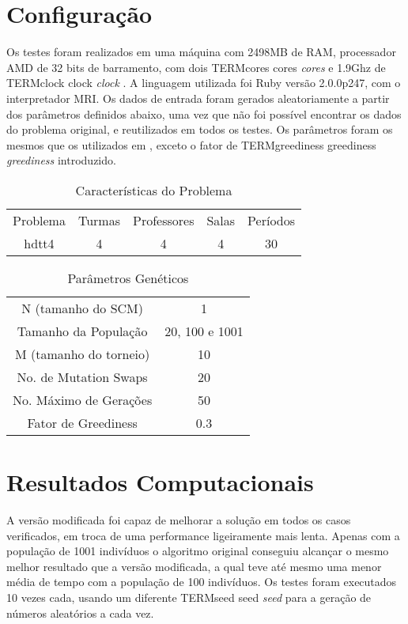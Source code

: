\documentclass[12pt,a4paper]{article}
\def\foreign#1{%
  \ifcsname TERM#1\endcsname%
  #1%
  \else%
  \emph{#1}%
  \expandafter\gdef\csname TERM#1\endcsname{}%
\fi}
\begin{document}
\section{Configuração}
Os testes foram realizados em uma máquina com 2498MB de RAM, processador AMD de
32 bits de barramento, com dois \foreign{cores} e 1.9Ghz de \foreign{clock}. A
linguagem utilizada foi Ruby versão 2.0.0p247, com o interpretador MRI. Os dados
de entrada foram gerados aleatoriamente a partir dos parâmetros definidos
abaixo, uma vez que não foi possível encontrar os dados do problema original, e
reutilizados em todos os testes. Os parâmetros foram os mesmos que os utilizados
em \cite{Raghavjee:2008:GASTP}, exceto o fator de \foreign{greediness}
introduzido.

\begin{table}
  \caption{Características do Problema}
  \centering
  \begin{tabular}{ c c c c c }
    Problema & Turmas & Professores & Salas & Períodos \\
       hdtt4 & 4 & 4 & 4 & 30 \\
  \end{tabular}
\end{table}

\begin{table}
  \caption{Parâmetros Genéticos}
  \centering
  \begin{tabular}{ c c }
    N (tamanho do SCM) & 1 \\
Tamanho da População & 20, 100 e 1001\\
M (tamanho do torneio) & 10 \\
 No. de Mutation Swaps & 20 \\
  No. Máximo de Gerações & 50 \\
        Fator de Greediness & 0.3 \\
  \end{tabular}
\end{table}

\section{Resultados Computacionais}
A versão modificada foi capaz de melhorar a solução em todos os casos
verificados, em troca de uma performance ligeiramente mais lenta. Apenas com a
população de 1001 indivíduos o algoritmo original conseguiu alcançar o mesmo
melhor resultado que a versão modificada, a qual teve até mesmo uma menor média
de tempo com a população de 100 indivíduos. Os testes foram executados 10 vezes
cada, usando um diferente \foreign{seed} para a geração de números aleatórios a
cada vez.
\end{document}
